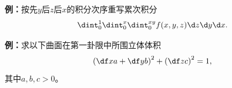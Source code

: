 {\bf 例：}按先$y$后$z$后$x$的积分次序重写累次积分
$$\dint_0^1\dint_0^x\dint_0^{xy}f(x,y,z)\d z\d y\d x.$$
\begin{center}
\end{center}

{\bf 例：}求以下曲面在第一卦限中所围立体体积
$$\left(\df xa+\df yb\right)^2+\left(\df zc\right)^2=1,$$
其中$a,b,c>0$。
\begin{center}
\end{center}


